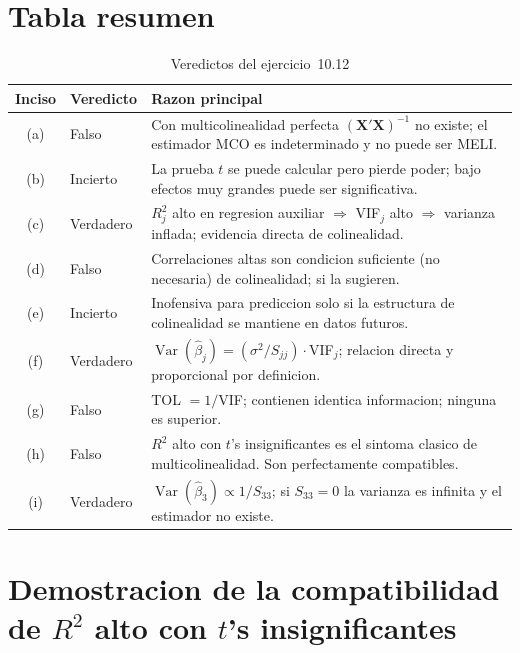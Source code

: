 \documentclass[12pt, letterpaper]{article}
\theoremstyle{remark}
\newcommand{\Var}{\operatorname{Var}}
\begin{document}
\bigskip

\section{Tabla resumen}

\begin{table}[ht]
\centering
\caption{Veredictos del ejercicio~10.12}
\label{tab:resumen}
\small
\begin{tabular}{clp{8.5cm}}
\toprule
\textbf{Inciso} & \textbf{Veredicto} & \textbf{Razon principal} \\
\midrule
(a) & Falso    & Con multicolinealidad perfecta $(\mathbf{X'X})^{-1}$ no existe; el estimador MCO es indeterminado y no puede ser MELI. \\[4pt]
(b) & Incierto & La prueba $t$ se puede calcular pero pierde poder; bajo efectos muy grandes puede ser significativa. \\[4pt]
(c) & Verdadero & $R^2_j$ alto en regresion auxiliar $\Rightarrow$ VIF$_j$ alto $\Rightarrow$ varianza inflada; evidencia directa de colinealidad. \\[4pt]
(d) & Falso    & Correlaciones altas son condicion suficiente (no necesaria) de colinealidad; si la sugieren. \\[4pt]
(e) & Incierto & Inofensiva para prediccion solo si la estructura de colinealidad se mantiene en datos futuros. \\[4pt]
(f) & Verdadero & $\Var(\hat\beta_j) = (\sigma^2/S_{jj})\cdot$VIF$_j$; relacion directa y proporcional por definicion. \\[4pt]
(g) & Falso    & TOL $= 1/$VIF; contienen identica informacion; ninguna es superior. \\[4pt]
(h) & Falso    & $R^2$ alto con $t$'s insignificantes es el sintoma clasico de multicolinealidad. Son perfectamente compatibles. \\[4pt]
(i) & Verdadero & $\Var(\hat\beta_3) \propto 1/S_{33}$; si $S_{33} = 0$ la varianza es infinita y el estimador no existe. \\
\bottomrule
\end{tabular}
\end{table}

\appendix

\section{Demostracion de la compatibilidad de $R^2$ alto con $t$'s insignificantes}
\end{document}
